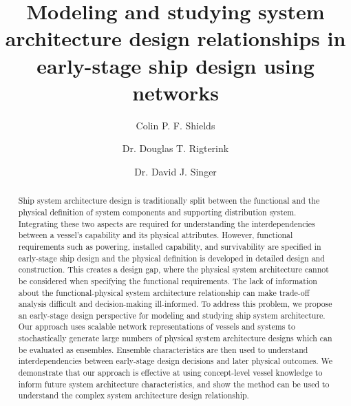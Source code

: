 \documentclass[preprint,12pt]{elsarticle}
\begin{document}
\begin{frontmatter}



\title{Modeling and studying system architecture design relationships in early-stage ship design using networks}


\author[1]{Colin P. F. Shields}
\author[1]{ Dr. Douglas T. Rigterink} 
\author[1]{ Dr. David J. Singer } 
\address[1]{University of Michigan, United States}

\begin{abstract}
Ship system architecture design is traditionally split between the functional and the physical definition of system components and supporting distribution system. Integrating these two aspects are required for understanding the interdependencies between a vessel's capability and its physical attributes. However, functional requirements such as powering, installed capability, and survivability are specified in early-stage ship design and the physical definition is developed in detailed design and construction. This creates a design gap, where the physical system architecture cannot be considered when specifying the functional requirements. The lack of information about the functional-physical system architecture relationship can make trade-off analysis difficult and decision-making ill-informed. To address this problem, we propose an early-stage design perspective for modeling and studying ship system architecture. Our approach uses scalable network representations of vessels and systems to stochastically generate large numbers of physical system architecture designs which can be evaluated as ensembles. Ensemble characteristics are then used to understand interdependencies between early-stage design decisions and later physical outcomes. We demonstrate that our approach is effective at using concept-level vessel knowledge to inform future system architecture characteristics, and show the method can be used to understand the complex system architecture design relationship.


\end{abstract}
\end{frontmatter}
\end{document}
